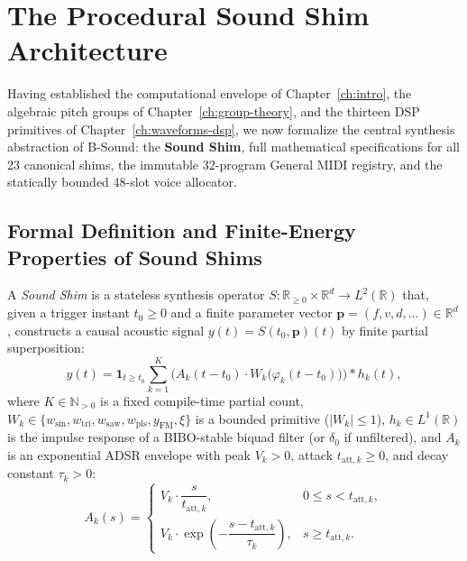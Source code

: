 \chapter{The Procedural Sound Shim Architecture}
\label{ch:shims}

Having established the computational envelope of Chapter~\ref{ch:intro}, the algebraic pitch groups of Chapter~\ref{ch:group-theory}, and the thirteen DSP primitives of Chapter~\ref{ch:waveforms-dsp}, we now formalize the central synthesis abstraction of B-Sound: the \textbf{Sound Shim}, full mathematical specifications for all 23 canonical shims, the immutable 32-program General MIDI registry, and the statically bounded 48-slot voice allocator.

\section{Formal Definition and Finite-Energy Properties of Sound Shims}

\begin{definition}
A \emph{Sound Shim} is a stateless synthesis operator $S : \mathbb{R}_{\ge 0} \times \mathbb{R}^d \to L^2(\mathbb{R})$ that, given a trigger instant $t_0 \ge 0$ and a finite parameter vector $\mathbf{p} = (f, v, d, \dots) \in \mathbb{R}^d$, constructs a causal acoustic signal $y(t) = S(t_0, \mathbf{p})(t)$ by finite partial superposition:
\begin{equation}
\label{eq:shim-def}
y(t) = \mathbf{1}_{t \ge t_0} \sum_{k=1}^{K} \Big( A_k(t - t_0)\cdot W_k\!\big(\varphi_k(t - t_0)\big) \Big) * h_k(t),
\end{equation}
where $K \in \mathbb{N}_{>0}$ is a fixed compile-time partial count, $W_k \in \{w_{\mathrm{sin}}, w_{\mathrm{tri}}, w_{\mathrm{saw}}, w_{\mathrm{pls}}, y_{\mathrm{FM}}, \xi\}$ is a bounded primitive ($|W_k| \le 1$), $h_k \in L^1(\mathbb{R})$ is the impulse response of a BIBO-stable biquad filter (or $\delta_0$ if unfiltered), and $A_k$ is an exponential ADSR envelope with peak $V_k > 0$, attack $t_{\mathrm{att}, k} \ge 0$, and decay constant $\tau_k > 0$:
\begin{equation}
\label{eq:shim-env}
A_k(s) =
\begin{cases}
V_k \cdot \dfrac{s}{t_{\mathrm{att}, k}}, & 0 \le s < t_{\mathrm{att}, k}, \\[6pt]
V_k \cdot \exp\!\left(-\dfrac{s - t_{\mathrm{att}, k}}{\tau_k}\right), & s \ge t_{\mathrm{att}, k}.
\end{cases}
\end{equation}
\end{definition}


